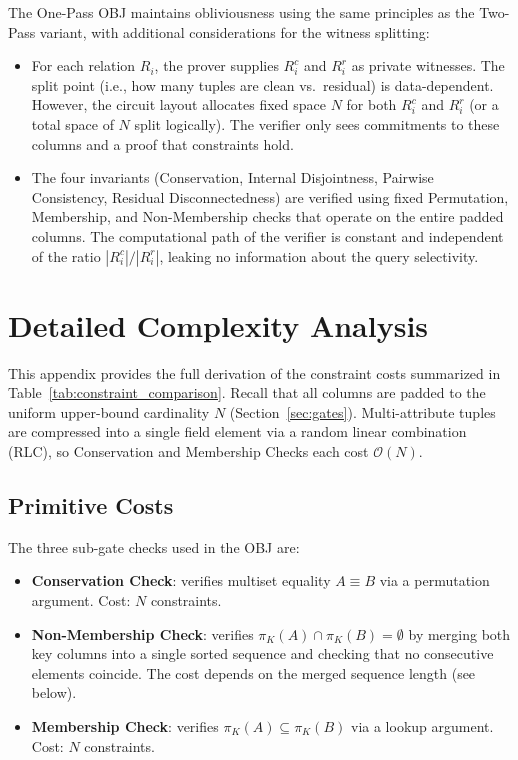 \documentclass[sigconf]{acmart}
\begin{document}
The One-Pass OBJ maintains obliviousness using the same principles as the Two-Pass variant, with additional considerations for the witness splitting:
\begin{itemize}[leftmargin=*]
    \item For each relation $R_i$, the prover supplies $R_i^c$ and $R_i^r$ as private witnesses. The split point (i.e., how many tuples are clean vs.\ residual) is data-dependent. However, the circuit layout allocates fixed space $N$ for both $R_i^c$ and $R_i^r$ (or a total space of $N$ split logically). The verifier only sees commitments to these columns and a proof that constraints hold.
    \item The four invariants (Conservation, Internal Disjointness, Pairwise Consistency, Residual Disconnectedness) are verified using fixed Permutation, Membership, and Non-Membership checks that operate on the entire padded columns. The computational path of the verifier is constant and independent of the ratio $|R_i^c|/|R_i^r|$, leaking no information about the query selectivity.
\end{itemize}


\section{Detailed Complexity Analysis}
\label{app:complexity}

This appendix provides the full derivation of the constraint costs summarized in Table~\ref{tab:constraint_comparison}.
Recall that all columns are padded to the uniform upper-bound cardinality $N$ (Section~\ref{sec:gates}).
Multi-attribute tuples are compressed into a single field element via a random linear combination (RLC), so Conservation and Membership Checks each cost $\mathcal{O}(N)$.

\subsection{Primitive Costs}

The three sub-gate checks used in the OBJ are:
\begin{itemize}
    \item \textbf{Conservation Check}: verifies multiset equality $A \equiv B$ via a permutation argument. Cost: $N$ constraints.
    \item \textbf{Non-Membership Check}: verifies $\pi_K(A) \cap \pi_K(B) = \emptyset$ by merging both key columns into a single sorted sequence and checking that no consecutive elements coincide. The cost depends on the merged sequence length (see below).
    \item \textbf{Membership Check}: verifies $\pi_K(A) \subseteq \pi_K(B)$ via a lookup argument. Cost: $N$ constraints.
\end{itemize}
\end{document}
